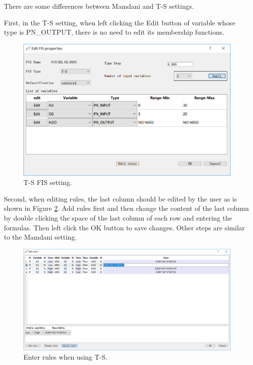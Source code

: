 \documentclass[journal,a4paper,onecolumn]{article}
\begin{document}
\clearpage
There are some differences between Mamdani and T-S settings. 

First, in the T-S setting, when left clicking the Edit button of variable whose type is PN\_OUTPUT, there is no need to edit its membership functions.

\begin{figure}[!hbt]
	\begin{center}
		\includegraphics[width=0.8\columnwidth]{fig11}
		\caption{T-S FIS setting.}
		\label{fig:T-S FIS}
	\end{center}
\end{figure}

Second, when editing rules, the last column should be edited by the user as is shown in Figure \ref{fig:Enter rules when using T-S}. 
Add rules first and then change the content of the last column by double clicking the space of the last column of each row and entering the formulas. Then left click the OK button to save changes. 
Other steps are similar to the Mamdani setting.

\begin{figure}[!hbt]
	\begin{center}
		\includegraphics[width=\columnwidth]{fig12}
		\caption{Enter rules when using T-S.}
		\label{fig:Enter rules when using T-S}
	\end{center}
\end{figure}
\end{document}
